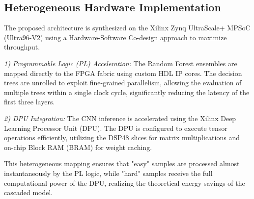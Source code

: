 \subsection{Heterogeneous Hardware Implementation}
The proposed architecture is synthesized on the Xilinx Zynq UltraScale+ MPSoC (Ultra96-V2) using a Hardware-Software Co-design approach to maximize throughput.

\textit{1) Programmable Logic (PL) Acceleration:} The Random Forest ensembles are mapped directly to the FPGA fabric using custom HDL IP cores. The decision trees are unrolled to exploit fine-grained parallelism, allowing the evaluation of multiple trees within a single clock cycle, significantly reducing the latency of the first three layers.

\textit{2) DPU Integration:} The CNN inference is accelerated using the Xilinx Deep Learning Processor Unit (DPU). The DPU is configured to execute tensor operations efficiently, utilizing the DSP48 slices for matrix multiplications and on-chip Block RAM (BRAM) for weight caching. 

This heterogeneous mapping ensures that "easy" samples are processed almost instantaneously by the PL logic, while "hard" samples receive the full computational power of the DPU, realizing the theoretical energy savings of the cascaded model.
